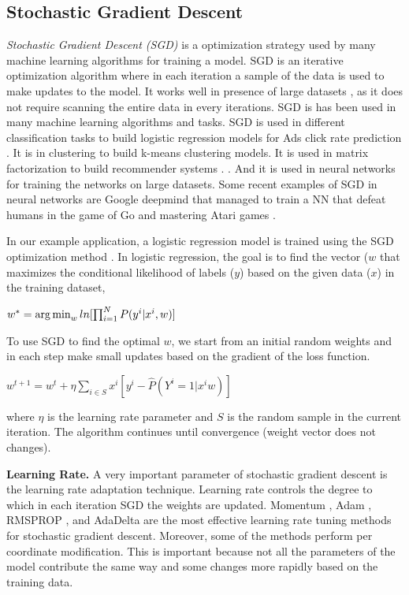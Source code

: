 \subsection{Stochastic Gradient Descent} \label{sgd}
\textit{Stochastic Gradient Descent (SGD) } is a optimization strategy used by many machine learning algorithms for training a model.
SGD is an iterative optimization algorithm where in each iteration a sample of the data is used to make updates to the model.
It works well in presence of large datasets \cite{bottou2010large}, as it does not require scanning the entire data in every iterations.
SGD is has been used in many machine learning algorithms and tasks.
SGD is used in different classification \cite{zhang2004solving} tasks to build logistic regression models for Ads click rate prediction \cite{macmahan2013}.
It is in clustering \cite{bottou1995convergence} to build k-means clustering models.
It is used in matrix factorization \cite{funk2006netflix} to build recommender systems  \cite{koren2009matrix}. .
And it is used in neural networks \cite{dean2012large} for training the networks on large datasets.
Some recent examples of SGD in neural networks are Google deepmind that managed to train a NN that defeat humans in the game of Go  \cite{silver2016mastering} and mastering Atari games \cite{mnih2013playing} .

In our example application, a logistic regression model is trained using the SGD optimization method \cite{macmahan2013}.
In logistic regression, the goal is to find the vector ($w$ that maximizes the conditional likelihood of labels ($y$) based on the given data ($x$) in the training dataset,

$w^* = \operatorname*{arg\,min}_w ln[\prod_{i=1}^{N} P(y^i | x^i, w)]$

To use SGD to find the optimal $w$, we start from an initial random weights and in each step make small updates based on the gradient of the loss function. 

${w}^{t+1} = {w}^t + \eta \sum_{i \in S} x^i [y^i - \hat{P}(Y^i = 1 | x^i w)]$

where $\eta$ is the learning rate parameter and $S$ is the random sample in the current iteration.
The algorithm continues until convergence (weight vector does not changes).

\textbf{Learning Rate. }
A very important parameter of stochastic gradient descent is the learning rate adaptation technique. 
Learning rate controls the degree to which in each iteration SGD the weights are updated.
Momentum \cite{qian1999momentum}, Adam \cite{kingma2014adam}, RMSPROP \cite{tieleman2012lecture}, and AdaDelta \cite{zeiler2012adaptive} are the most effective learning rate tuning methods for stochastic gradient descent. 
Moreover, some of the methods perform per coordinate modification. 
This is important because not all the parameters of the model contribute the same way and some changes more rapidly based on the training data.

